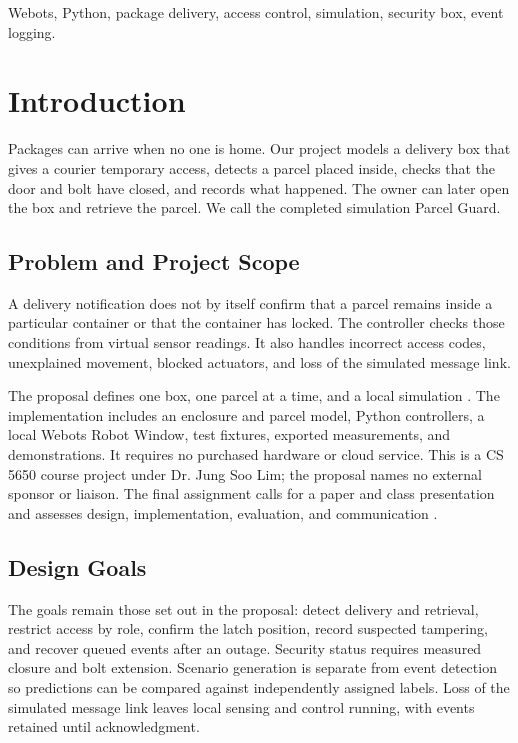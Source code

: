 \documentclass[conference,letterpaper]{IEEEtran}
\begin{document}
\begin{IEEEkeywords}
Webots, Python, package delivery, access control, simulation, security box, event logging.
\end{IEEEkeywords}
\section{Introduction}
\label{sec:intro}
Packages can arrive when no one is home. Our project models a delivery box that gives a courier temporary access, detects a parcel placed inside, checks that the door and bolt have closed, and records what happened. The owner can later open the box and retrieve the parcel. We call the completed simulation Parcel Guard.

\subsection{Problem and Project Scope}
A delivery notification does not by itself confirm that a parcel remains inside a particular container or that the container has locked. The controller checks those conditions from virtual sensor readings. It also handles incorrect access codes, unexplained movement, blocked actuators, and loss of the simulated message link.

The proposal defines one box, one parcel at a time, and a local simulation \cite{proposal}. The implementation includes an enclosure and parcel model, Python controllers, a local Webots Robot Window, test fixtures, exported measurements, and demonstrations. It requires no purchased hardware or cloud service. This is a CS 5650 course project under Dr. Jung Soo Lim; the proposal names no external sponsor or liaison. The final assignment calls for a paper and class presentation and assesses design, implementation, evaluation, and communication \cite{rubric}.

\subsection{Design Goals}
The goals remain those set out in the proposal: detect delivery and retrieval, restrict access by role, confirm the latch position, record suspected tampering, and recover queued events after an outage. Security status requires measured closure and bolt extension. Scenario generation is separate from event detection so predictions can be compared against independently assigned labels. Loss of the simulated message link leaves local sensing and control running, with events retained until acknowledgment.
\end{document}

